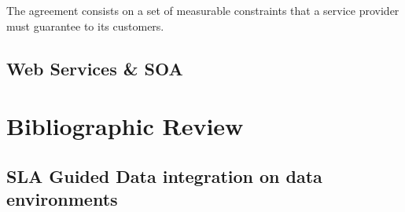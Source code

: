 \documentclass{article}
\begin{document}
The agreement consists on a set of measurable constraints that a service provider must guarantee to its customers.



\subsection{Web Services \& SOA}















\section{Bibliographic Review}
\subsection{SLA Guided Data integration on data environments}














\newpage

	
\end{document}

